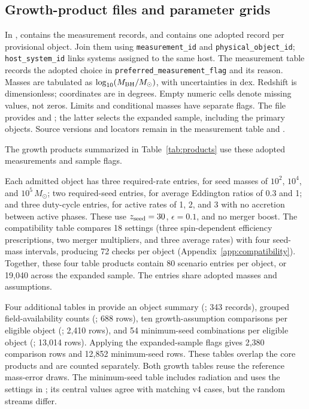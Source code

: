 \documentclass[pdflatex,sn-basic]{sn-jnl}
\begin{document}


\subsection{Growth-product files and parameter grids}
\label{app:product-files}

In , 
contains the measurement records, and 
contains one adopted record per provisional object. Join them using
\texttt{measurement\_id} and \texttt{physical\_object\_id};
\texttt{host\_system\_id} links systems assigned to the same host.
The measurement table records the adopted choice in
\texttt{preferred\_measurement\_flag} and its reason.
Masses are tabulated as $\log_{10}(M_{\rm BH}/M_\odot)$, with
uncertainties in dex. Redshift is dimensionless; coordinates are in degrees. Empty numeric cells denote missing values, not
zeros. Limits and conditional masses have separate flags.
The file
provides  and
; the latter selects the expanded sample,
including the primary objects. Source versions and locators remain in the
measurement table and .

The growth products summarized in Table~\ref{tab:products} use these
adopted measurements and sample flags.

Each admitted object has three required-rate entries, for seed masses of
$10^2$, $10^4$, and $10^5\,M_\odot$; two required-seed entries, for average
Eddington ratios of 0.3 and 1; and three duty-cycle entries, for active rates
of 1, 2, and 3 with no accretion between active phases. These use
$z_{\rm seed}=30$, $\epsilon=0.1$, and no merger boost.
The compatibility table compares 18 settings (three spin-dependent efficiency
prescriptions, two merger multipliers, and three average rates) with four
seed-mass intervals, producing 72 checks per object
(Appendix~\ref{app:compatibility}). Together, these four table products contain
80 scenario entries per object, or 19,040 across the expanded sample.
The entries share adopted masses and assumptions.

Four additional tables in  provide an object summary
(; 343 records), grouped field-availability counts
(; 688 rows), ten growth-assumption comparisons
per eligible object (; 2,410 rows),
and 54 minimum-seed combinations per eligible object
(; 13,014 rows). Applying the expanded-sample
flags gives 2,380 comparison rows and 12,852 minimum-seed rows. These tables
overlap the core products and are counted separately. Both growth tables reuse
the reference mass-error draws. The minimum-seed table includes radiation and uses the
settings in ; its
central values agree with matching v4 cases, but the random streams differ.
\end{document}

